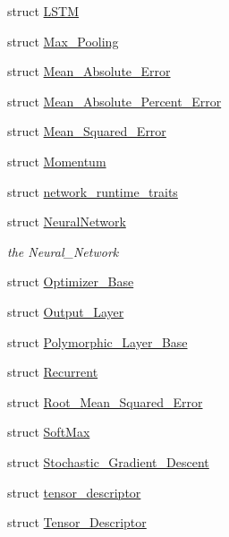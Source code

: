 \begin{DoxyCompactItemize}
\item 
struct \hyperlink{structbc_1_1nn_1_1LSTM}{L\+S\+TM}
\item 
struct \hyperlink{structbc_1_1nn_1_1Max__Pooling}{Max\+\_\+\+Pooling}
\item 
struct \hyperlink{structbc_1_1nn_1_1Mean__Absolute__Error}{Mean\+\_\+\+Absolute\+\_\+\+Error}
\item 
struct \hyperlink{structbc_1_1nn_1_1Mean__Absolute__Percent__Error}{Mean\+\_\+\+Absolute\+\_\+\+Percent\+\_\+\+Error}
\item 
struct \hyperlink{structbc_1_1nn_1_1Mean__Squared__Error}{Mean\+\_\+\+Squared\+\_\+\+Error}
\item 
struct \hyperlink{structbc_1_1nn_1_1Momentum}{Momentum}
\item 
struct \hyperlink{structbc_1_1nn_1_1network__runtime__traits}{network\+\_\+runtime\+\_\+traits}
\item 
struct \hyperlink{structbc_1_1nn_1_1NeuralNetwork}{Neural\+Network}
\begin{DoxyCompactList}\small\item\em the Neural\+\_\+\+Network \end{DoxyCompactList}\item 
struct \hyperlink{structbc_1_1nn_1_1Optimizer__Base}{Optimizer\+\_\+\+Base}
\item 
struct \hyperlink{structbc_1_1nn_1_1Output__Layer}{Output\+\_\+\+Layer}
\item 
struct \hyperlink{structbc_1_1nn_1_1Polymorphic__Layer__Base}{Polymorphic\+\_\+\+Layer\+\_\+\+Base}
\item 
struct \hyperlink{structbc_1_1nn_1_1Recurrent}{Recurrent}
\item 
struct \hyperlink{structbc_1_1nn_1_1Root__Mean__Squared__Error}{Root\+\_\+\+Mean\+\_\+\+Squared\+\_\+\+Error}
\item 
struct \hyperlink{structbc_1_1nn_1_1SoftMax}{Soft\+Max}
\item 
struct \hyperlink{structbc_1_1nn_1_1Stochastic__Gradient__Descent}{Stochastic\+\_\+\+Gradient\+\_\+\+Descent}
\item 
struct \hyperlink{structbc_1_1nn_1_1tensor__descriptor}{tensor\+\_\+descriptor}
\item 
struct \hyperlink{structbc_1_1nn_1_1Tensor__Descriptor}{Tensor\+\_\+\+Descriptor}
\end{DoxyCompactItemize}
